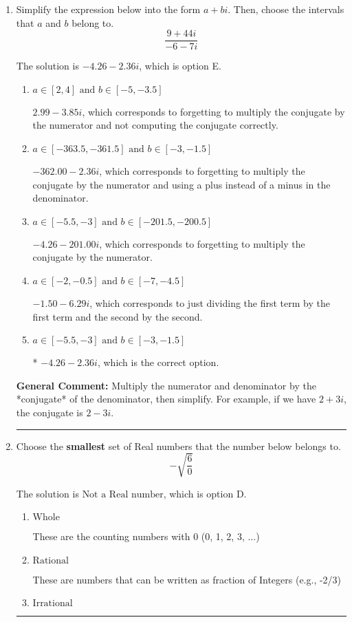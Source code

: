 \documentclass{extbook}[14pt]
\newcommand{\litem}[1]{\item #1

\rule{\textwidth}{0.4pt}}
\begin{document}
\begin{enumerate}\litem{
Simplify the expression below into the form $a+bi$. Then, choose the intervals that $a$ and $b$ belong to.
\[ \frac{9 + 44 i}{-6 - 7 i} \]

The solution is \( -4.26  - 2.36 i \), which is option E.\begin{enumerate}[label=\Alph*.]
\item \( a \in [2, 4] \text{ and } b \in [-5, -3.5] \)

 $2.99  - 3.85 i$, which corresponds to forgetting to multiply the conjugate by the numerator and not computing the conjugate correctly.
\item \( a \in [-363.5, -361.5] \text{ and } b \in [-3, -1.5] \)

 $-362.00  - 2.36 i$, which corresponds to forgetting to multiply the conjugate by the numerator and using a plus instead of a minus in the denominator.
\item \( a \in [-5.5, -3] \text{ and } b \in [-201.5, -200.5] \)

 $-4.26  - 201.00 i$, which corresponds to forgetting to multiply the conjugate by the numerator.
\item \( a \in [-2, -0.5] \text{ and } b \in [-7, -4.5] \)

 $-1.50  - 6.29 i$, which corresponds to just dividing the first term by the first term and the second by the second.
\item \( a \in [-5.5, -3] \text{ and } b \in [-3, -1.5] \)

* $-4.26  - 2.36 i$, which is the correct option.
\end{enumerate}

\textbf{General Comment:} Multiply the numerator and denominator by the *conjugate* of the denominator, then simplify. For example, if we have $2+3i$, the conjugate is $2-3i$.
}
\litem{
Choose the \textbf{smallest} set of Real numbers that the number below belongs to.
\[ -\sqrt{\frac{6}{0}} \]

The solution is \( \text{Not a Real number} \), which is option D.\begin{enumerate}[label=\Alph*.]
\item \( \text{Whole} \)

These are the counting numbers with 0 (0, 1, 2, 3, ...)
\item \( \text{Rational} \)

These are numbers that can be written as fraction of Integers (e.g., -2/3)
\item \( \text{Irrational} \)


\end{enumerate}}
\end{enumerate}
\end{document}
